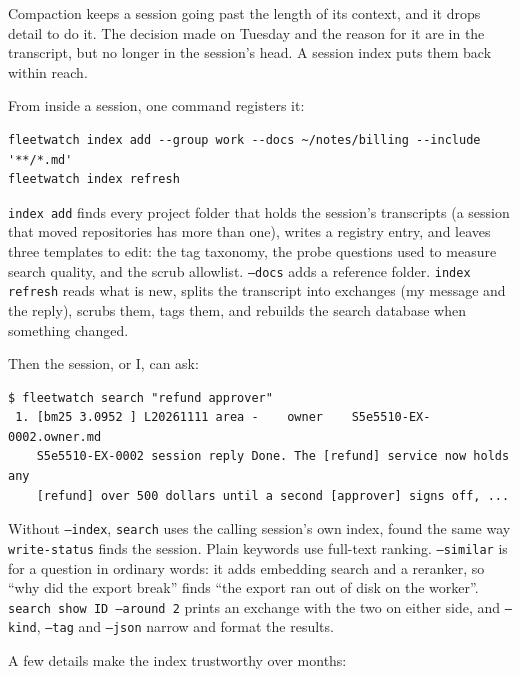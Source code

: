 \documentclass[11pt, letterpaper]{article}
\newenvironment{code}{\par\smallskip\small}{\par\smallskip}
\newcommand{\cmd}[1]{\texttt{#1}}
\begin{document}
Compaction keeps a session going past the length of its context, and it drops detail to do
it. The decision made on Tuesday and the reason for it are in the transcript, but no longer in
the session's head. A session index puts them back within reach.

From inside a session, one command registers it:

\begin{code}
\begin{verbatim}
fleetwatch index add --group work --docs ~/notes/billing --include '**/*.md'
fleetwatch index refresh
\end{verbatim}
\end{code}

\cmd{index add} finds every project folder that holds the session's transcripts (a session
that moved repositories has more than one), writes a registry entry, and leaves three
templates to edit: the tag taxonomy, the probe questions used to measure search quality, and
the scrub allowlist. \cmd{--docs} adds a reference folder. \cmd{index refresh} reads what is
new, splits the transcript into exchanges (my message and the reply), scrubs them, tags
them, and rebuilds the search database when something changed.

Then the session, or I, can ask:

\begin{code}
\begin{verbatim}
$ fleetwatch search "refund approver"
 1. [bm25 3.0952 ] L20261111 area -    owner    S5e5510-EX-0002.owner.md
    S5e5510-EX-0002 session reply Done. The [refund] service now holds any
    [refund] over 500 dollars until a second [approver] signs off, ...
\end{verbatim}
\end{code}

Without \cmd{--index}, \cmd{search} uses the calling session's own index, found the same way
\cmd{write-status} finds the session. Plain keywords use full-text ranking. \cmd{--similar}
is for a question in ordinary words: it adds embedding search and a reranker, so ``why did
the export break'' finds ``the export ran out of disk on the worker''. \cmd{search show ID
--around 2} prints an exchange with the two on either side, and \cmd{--kind}, \cmd{--tag} and
\cmd{--json} narrow and format the results.

A few details make the index trustworthy over months:
\end{document}
